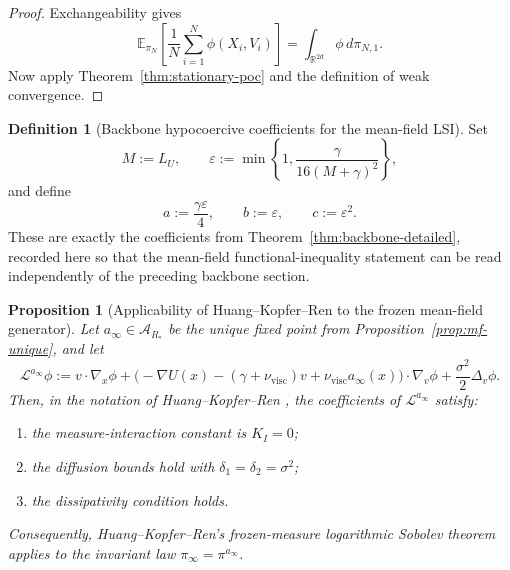 \documentclass[11pt]{article}
\newtheorem{proposition}[theorem]{Proposition}
\theoremstyle{definition}
\newtheorem{definition}[theorem]{Definition}
\theoremstyle{remark}
\newcommand{\R}{\mathbb{R}}
\newcommand{\E}{\mathbb{E}}
\begin{document}
\begin{proof}
Exchangeability gives
\[
\E_{\pi_N}\!\left[\frac1N\sum_{i=1}^N \phi(X_i,V_i)\right]
=
\int_{\R^{2d}} \phi\,d\pi_{N,1}.
\]
Now apply Theorem~\ref{thm:stationary-poc} and the definition of weak
convergence.
\end{proof}

\begin{definition}[Backbone hypocoercive coefficients for the mean-field LSI]\label{def:mf-lsi-coeffs}
Set
\[
M:=L_U,
\qquad
\varepsilon:=\min\left\{1,\frac{\gamma}{16(M+\gamma)^2}\right\},
\]
and define
\[
a:=\frac{\gamma\varepsilon}{4},
\qquad
b:=\varepsilon,
\qquad
c:=\varepsilon^2.
\]
These are exactly the coefficients from
Theorem~\ref{thm:backbone-detailed}, recorded here so that the mean-field
functional-inequality statement can be read independently of the preceding
backbone section.
\end{definition}

\begin{proposition}[Applicability of Huang--Kopfer--Ren to the frozen mean-field generator]\label{prop:hkr-applicability}
Let \(a_\infty\in \mathcal A_{R_*}\) be the unique fixed point from
Proposition~\ref{prop:mf-unique}, and let
\[
\mathcal L^{a_\infty}\phi
:=
v\cdot \nabla_x \phi
+\bigl(-\nabla U(x)-(\gamma+\nu_{\mathrm{visc}})v+\nu_{\mathrm{visc}}a_\infty(x)\bigr)
\cdot \nabla_v \phi
+\frac{\sigma^2}{2}\Delta_v \phi.
\]
Then, in the notation of Huang--Kopfer--Ren
\cite[Theorem~3.5]{huang2026logsobolev}, the coefficients of
\(\mathcal L^{a_\infty}\) satisfy:
\begin{enumerate}[label=\textnormal{(\roman*)},leftmargin=1.5em]
\item the measure-interaction constant is \(K_I=0\);
\item the diffusion bounds \cite[(57), (63)]{huang2026logsobolev} hold with
\(\delta_1=\delta_2=\sigma^2\);
\item the dissipativity condition \cite[(C) with \(R=0\)]{huang2026logsobolev}
holds.
\end{enumerate}
Consequently, Huang--Kopfer--Ren's frozen-measure logarithmic Sobolev theorem
applies to the invariant law \(\pi_\infty=\pi^{a_\infty}\).
\end{proposition}
\end{document}
